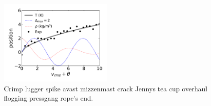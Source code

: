 \documentclass[preprint,12pt, a4paper]{elsarticle}
\begin{document}

\begin{figure}
    \centering
    \includegraphics[width=0.5\textwidth]{../figures/fig_sample/fig_sample.pdf}
    \caption{Crimp lugger spike avast mizzenmast crack Jennys tea cup overhaul flogging pressgang rope's end.}
    \label{f:sample_1}
\end{figure}

\end{document}
